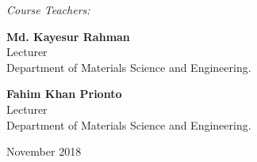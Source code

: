 \documentclass[12pt,a4paper]{article}
\begin{document}
\begin{titlepage}
\begin{center}
\bigskip 
\bigskip 
\bigskip 
\bigskip 
\textit{Course Teachers:}\\
[0.5cm]
\end{center}
\begin{minipage}[left]{3.5in}%
		\flushleft
		\textbf{Md. Kayesur Rahman}\\
		Lecturer\\
		Department of Materials Science and Engineering.\\
\end{minipage}
\begin{minipage}[right]{2.7in}%
		\flushright
		\textbf{Fahim Khan Prionto}\\
		Lecturer\\
		Department of Materials Science and Engineering.\\
\end{minipage}

	\begin{center}%
	\bigskip 
	\bigskip 
	\bigskip 
	\bigskip  
	 November 2018\\
	\end{center}
	
\end{titlepage}
\end{document}
